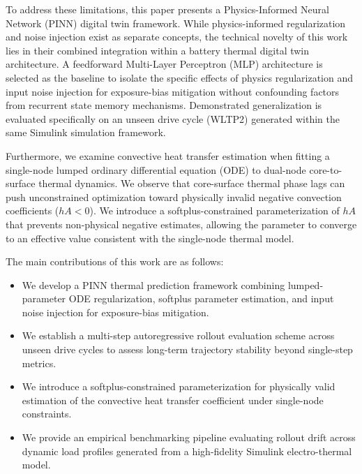 To address these limitations, this paper presents a Physics-Informed Neural Network (PINN) digital twin framework. While physics-informed regularization and noise injection exist as separate concepts, the technical novelty of this work lies in their combined integration within a battery thermal digital twin architecture. A feedforward Multi-Layer Perceptron (MLP) architecture is selected as the baseline to isolate the specific effects of physics regularization and input noise injection for exposure-bias mitigation without confounding factors from recurrent state memory mechanisms. Demonstrated generalization is evaluated specifically on an unseen drive cycle (WLTP2) generated within the same Simulink simulation framework.

Furthermore, we examine convective heat transfer estimation when fitting a single-node lumped ordinary differential equation (ODE) to dual-node core-to-surface thermal dynamics. We observe that core-surface thermal phase lags can push unconstrained optimization toward physically invalid negative convection coefficients ($hA < 0$). We introduce a softplus-constrained parameterization of $hA$ that prevents non-physical negative estimates, allowing the parameter to converge to an effective value consistent with the single-node thermal model.

The main contributions of this work are as follows:
\begin{itemize}
    \item We develop a PINN thermal prediction framework combining lumped-parameter ODE regularization, softplus parameter estimation, and input noise injection for exposure-bias mitigation.
    \item We establish a multi-step autoregressive rollout evaluation scheme across unseen drive cycles to assess long-term trajectory stability beyond single-step metrics.
    \item We introduce a softplus-constrained parameterization for physically valid estimation of the convective heat transfer coefficient under single-node constraints.
    \item We provide an empirical benchmarking pipeline evaluating rollout drift across dynamic load profiles generated from a high-fidelity Simulink electro-thermal model.
\end{itemize}
